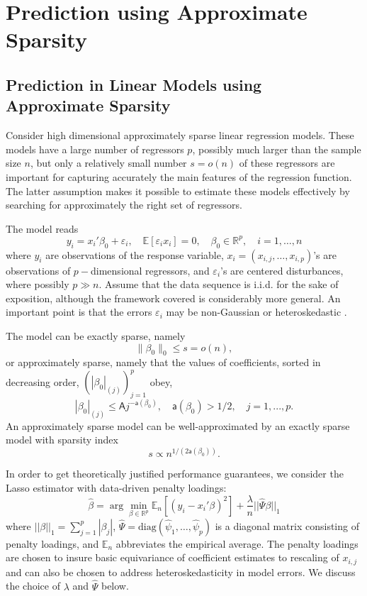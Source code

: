 \documentclass{amsart}\usepackage[]{graphicx}\usepackage[]{color}
\begin{document}


\section{Prediction using Approximate Sparsity}


\subsection{Prediction in Linear Models using Approximate Sparsity}


Consider high dimensional approximately sparse linear regression models. These models have a large number of regressors $p$, possibly much larger than the sample size $n$, but only a relatively small number $s =o(n)$ of these regressors are important for capturing accurately the main features of the regression function. The latter assumption makes it possible to estimate these models effectively by searching for approximately the right set of regressors.

The model reads \[ y_i = x_i' \beta_0  + \varepsilon_i, \quad \mathbb{E}[\varepsilon_i x_i]=0, \quad \beta_0 \in \mathbb{R}^p, 
\quad i=1,\ldots,n \]
where $y_i$ are observations of the response variable, $x_i=(x_{i,j}, \ldots, x_{i,p})$'s are observations of $p-$dimensional  regressors, and $\varepsilon_i$'s are centered disturbances, where possibly $p \gg n$.   Assume that the data sequence is
i.i.d. for the sake of exposition, although the framework covered is considerably more general. An important point is that the errors $\varepsilon_i$ may be non-Gaussian or heteroskedastic \citep{BCCH12}.



The model can be exactly sparse, namely
\[
\| \beta_0\|_0 \leq s = o(n),
\]
or approximately sparse, namely that the values of coefficients, sorted in decreasing
order, $(| \beta_0|_{(j)})_{j=1}^p$ obey,
\[
| \beta_0|_{(j)} \leq \mathsf{A} j^{-\mathsf{a}(\beta_0)},  \quad \mathsf{a}(\beta_0)>1/2, \quad j=1,...,p.
\]
An approximately sparse model can be well-approximated by an exactly sparse model
with sparsity index \[s \propto n^{1/(2 \mathsf{a}(\beta_0))}.\]





In order to get  theoretically justified performance guarantees,  we consider the Lasso 
estimator with data-driven penalty loadings: 
\[ \hat \beta = \arg \min_{\beta \in  \mathbb{R}^p} \mathbb{E}_n [(y_i - x_i' \beta)^2] + \frac{\lambda}{n} ||\hat{\Psi} \beta||_1 \]
where $||\beta||_1=\sum_{j=1}^p |\beta_j|$, $\hat{\Psi}=\mathrm{diag}(\hat{\psi}_1,\ldots,\hat{\psi}_p)$ is a diagonal matrix consisting of  penalty loadings, and $\mathbb{E}_n$ abbreviates the empirical average. The penalty loadings are chosen to insure basic equivariance of coefficient estimates to rescaling of $x_{i,j}$ and can also be chosen to address heteroskedasticity in model errors.   We discuss the choice of $\lambda$ and $\hat \Psi$ below.
\end{document}
